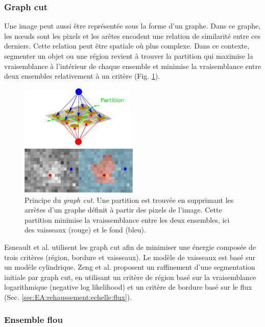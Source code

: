       \subsubsection{Graph cut}

      Une image peut aussi être représentée sous la forme d'un graphe. Dans ce graphe, les nœuds sont les pixels et les arêtes encodent une relation de similarité entre ces derniers. Cette relation peut être spatiale où plus complexe. Dans ce contexte, segmenter un objet ou une région revient à trouver la partition qui maximise la vraisemblance à l'intérieur de chaque ensemble et minimise la vraisemblance entre deux ensembles relativement à un critère (Fig. \ref{fig:graph_cut}).

      \begin{figure}[h]
        \centering
        \includegraphics[width=0.5\textwidth]{Images/graph_cut.png}
        \caption{Principe du \textit{graph cut}. Une partition est trouvée en supprimant les arrètes d'un graphe définit à partir des pixels de l'image. Cette partition minimise la vraissemblance entre les deux ensembles, ici des vaisseaux (rouge) et le fond (bleu). }
        \label{fig:graph_cut}
      \end{figure}

      Esneault et al. \cite{Esneault2009_moments_graph_cut} utilisent les graph cut afin de minimiser une énergie composée de trois critères (région, bordure et vaisseaux). Le modèle de vaisseaux est basé sur un modèle cylindrique. Zeng et al. \cite{Zeng2017_liver_oof_graph_cut} proposent un raffinement d'une segmentation initiale par graph cut, en utilisant un critère de région basé sur la vraisemblance logarithmique (negative log likelihood) et un critère de bordure basé sur le flux (Sec. \ref{sec:EA:rehaussement:echelle:flux}).

      \subsubsection{Ensemble flou}

